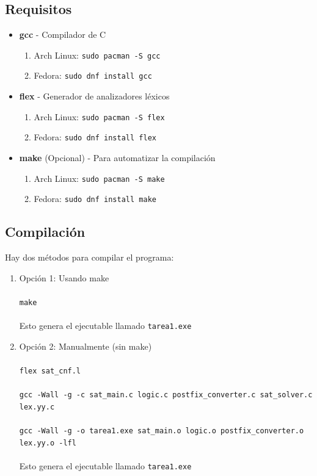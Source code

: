 \documentclass{report}
\begin{document}
	\subsection{Requisitos}
	\begin{itemize}
		\item \textbf{gcc} - Compilador de C 
		\begin{enumerate}
			\item Arch Linux: \texttt{sudo pacman -S gcc}
			\item Fedora: \texttt{sudo dnf install gcc}
		\end{enumerate}
		\item \textbf{flex} - Generador de analizadores l\'exicos
		\begin{enumerate}
			\item Arch Linux: \texttt{sudo pacman -S flex}
			\item Fedora: \texttt{sudo dnf install flex}
		\end{enumerate}
		\item \textbf{make} (Opcional) - Para automatizar la compilaci\'on
		\begin{enumerate}
			\item Arch Linux: \texttt{sudo pacman -S make}
			\item Fedora: \texttt{sudo dnf install make}
		\end{enumerate}
	\end{itemize}
	\subsection{Compilaci\'on}
	Hay dos m\'etodos para compilar el programa:
	\begin{enumerate}
		\item Opci\'on 1: Usando make \\\\\texttt{make} \\\\
		Esto genera el ejecutable llamado \texttt{tarea1.exe}
		\item Opci\'on 2: Manualmente (sin make) \\\\
		\texttt{flex sat\_cnf.l} \\\\
		\texttt{gcc -Wall -g -c sat\_main.c logic.c postfix\_converter.c sat\_solver.c lex.yy.c} \\\\
		\texttt{gcc -Wall -g -o tarea1.exe sat\_main.o logic.o postfix\_converter.o lex.yy.o -lfl} \\\\
		Esto genera el ejecutable llamado \texttt{tarea1.exe}
	\end{enumerate}
\end{document}
